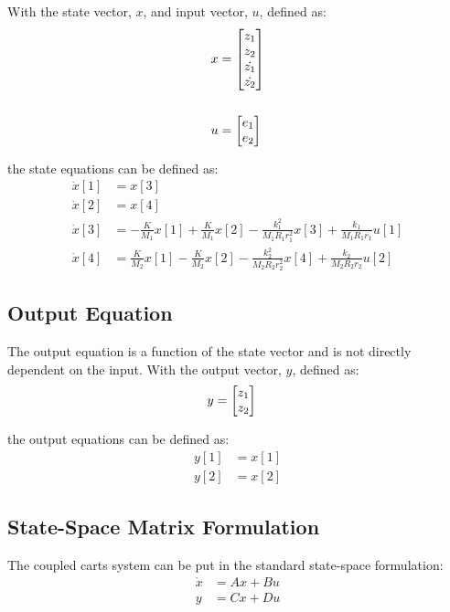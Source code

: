 \documentclass[]{article}
\begin{document}
		With the state vector, $x$, and input vector, $u$, defined as:
		\begin{align}
			x &= \mqty[z_1\\ z_2\\ \dot{z_1}\\ \dot{z_2}] \label{eq:carts_x_def}\\
			\nonumber\\
			u &= \mqty[e_1\\ e_2] \label{eq:carts_u_def}
		\end{align}
		
		the state equations can be defined as:
		\begin{equation}\label{eq:carts_state_eqs}
			\begin{aligned}
				\dot{x}[1] &= x[3]\\
				\dot{x}[2] &= x[4]\\
				\dot{x}[3] &= -\frac{K}{M_1} x[1] + \frac{K}{M_1} x[2] - \frac{k_1^2}{M_1 R_1 r_1^2} x[3] + \frac{k_1}{M_1 R_1 r_1} u[1]\\
				\dot{x}[4] &= \frac{K}{M_2} x[1] - \frac{K}{M_2} x[2] - \frac{k_2^2}{M_2 R_2 r_2^2} x[4] + \frac{k_2}{M_2 R_2 r_2} u[2]
			\end{aligned}
		\end{equation}

	\subsection{Output Equation}
		The output equation is a function of the state vector and is not directly dependent on the input. With the output vector, $y$, defined as:
		\begin{align}
			y &= \mqty[z_1\\ z_2]\label{eq:carts_y_def}
		\end{align}
		
		the output equations can be defined as:
		\begin{equation}\label{eq:carts_y_ouput_eqs}
			\begin{aligned}
				y[1] &= x[1]\\
				y[2] &= x[2]
			\end{aligned}
		\end{equation}
	
	\subsection{State-Space Matrix Formulation}
		The coupled carts system can be put in the standard state-space formulation:
		\begin{equation}\label{eq:state_space_eqs_def}
			\begin{aligned}
				\dot{x} &= A x + B u\\
				y &= C x + D u
			\end{aligned}
		\end{equation}
		 
\end{document}
